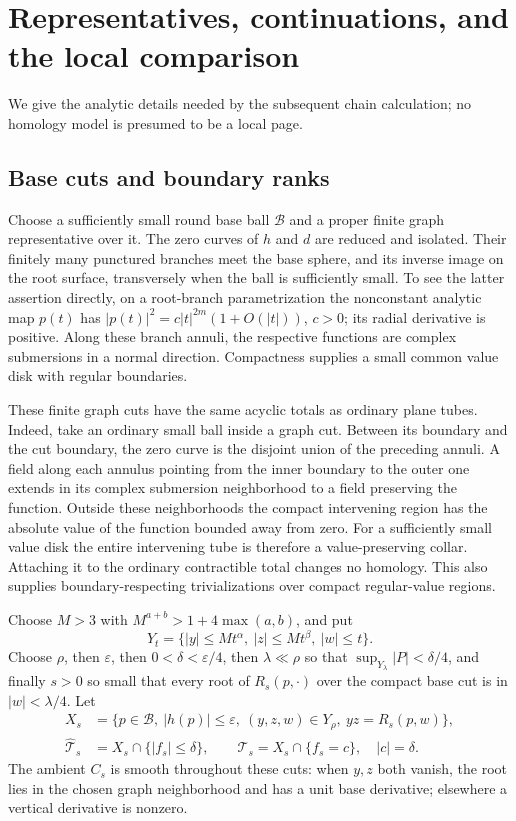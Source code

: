 \documentclass[11pt]{article}
\begin{document}
\section{Representatives, continuations, and the local comparison}

We give the analytic details needed by the subsequent chain
calculation; no homology model is presumed to be a local page.

\subsection{Base cuts and boundary ranks}

Choose a sufficiently small round base ball \(\mathcal B\) and a
proper finite graph representative over it. The zero curves of \(h\)
and \(d\) are reduced and isolated. Their finitely many punctured
branches meet the base sphere, and its inverse image on the root
surface, transversely when the ball is sufficiently small. To see the
latter assertion directly, on a root-branch parametrization the
nonconstant analytic map \(p(t)\) has
\(|p(t)|^2=c|t|^{2m}(1+O(|t|))\), \(c>0\);
its radial derivative is positive. Along these branch annuli,
the respective functions are complex submersions in a normal
direction. Compactness supplies a small common value disk with
regular boundaries.

These finite graph cuts have the same acyclic totals as ordinary
plane tubes. Indeed, take an ordinary small ball inside a graph cut.
Between its boundary and the cut boundary, the zero curve is the
disjoint union of the preceding annuli. A field along each annulus
pointing from the inner boundary to the outer one extends in its
complex submersion neighborhood to a field preserving the function.
Outside these neighborhoods the compact intervening region has
the absolute value of the function bounded away from zero.
For a sufficiently small value disk the entire intervening tube
is therefore a value-preserving collar. Attaching it to the ordinary
contractible total changes no homology. This also supplies
boundary-respecting trivializations over compact regular-value regions.

Choose \(M>3\) with \(M^{a+b}>1+4\max(a,b)\), and put
\[
Y_t=\{|y|\le Mt^\alpha,\ |z|\le Mt^\beta,\ |w|\le t\}.
\]
Choose \(\rho\), then \(\varepsilon\), then
\(0<\delta<\varepsilon/4\), then \(\lambda\ll\rho\) so that
\(\sup_{Y_\lambda}|P|<\delta/4\), and finally \(s>0\)
so small that every root of \(R_s(p,\cdot)\) over the compact
base cut is in \(|w|<\lambda/4\).
Let
\[
\begin{split}
X_s&=\{p\in\mathcal B,\ |h(p)|\le\varepsilon,\
               (y,z,w)\in Y_\rho,\ yz=R_s(p,w)\},\\
\widehat{\mathcal T}_s&=X_s\cap\{|f_s|\le\delta\},\qquad
\mathcal T_s=X_s\cap\{f_s=c\},\quad |c|=\delta .
\end{split}                                                     \tag{13}
\]
The ambient \(C_s\) is smooth throughout these cuts: when \(y,z\)
both vanish, the root lies in the chosen graph neighborhood and
has a unit base derivative; elsewhere a vertical derivative is
nonzero.
\end{document}
